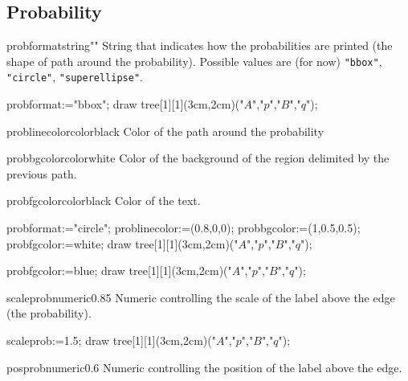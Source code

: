 \documentclass[11pt,a4paper,english]{article}
\begin{document}
\subsection{Probability}

\begin{mptparam}{probformat}{string}{""}
String that indicates how the probabilities are printed (the shape of path around the probability). Possible values are (for now) \verb|"bbox"|, \verb|"circle"|, \verb|"superellipse"|.
\end{mptparam}

\begin{exemple}[lefthand ratio=0.65]
 probformat:="bbox";
 draw tree[1][1](3cm,2cm)("$A$","$p$","$B$","$q$");
\end{exemple}

\begin{mptparam}{problinecolor}{color}{black}
Color of the path around the probability
\end{mptparam}

\begin{mptparam}{probbgcolor}{color}{white}
Color of the background of the region delimited by the previous path.
\end{mptparam}

\begin{mptparam}{probfgcolor}{color}{black}
Color of the text.
\end{mptparam}


\begin{exemple}[lefthand ratio=0.65]
probformat:="circle";
problinecolor:=(0.8,0,0);
probbgcolor:=(1,0.5,0.5);
probfgcolor:=white;
draw tree[1][1](3cm,2cm)("$A$","$p$","$B$","$q$");
\end{exemple}

\begin{exemple}[lefthand ratio=0.65]
probfgcolor:=blue;
draw tree[1][1](3cm,2cm)("$A$","$p$","$B$","$q$");
\end{exemple}


\begin{mptparam}{scaleprob}{numeric}{0.85}
Numeric controlling the scale of the label above the edge (the probability).
\end{mptparam}

\begin{exemple}[lefthand ratio=0.65]
 scaleprob:=1.5;
 draw tree[1][1](3cm,2cm)("$A$","$p$","$B$","$q$");
\end{exemple}


\begin{mptparam}{posprob}{numeric}{0.6}
Numeric controlling the position of the label above the edge.
\end{mptparam}
\end{document}
